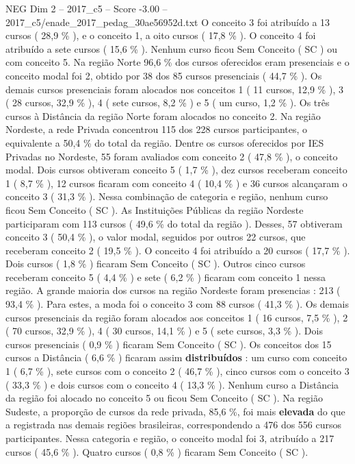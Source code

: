 \begin{textsample}{NEG Dim 2 – 2017\_c5 – Score -3.00 – 2017\_c5/enade\_2017\_pedag\_30ae56952d.txt}
O conceito 3 foi atribuído a 13 cursos ( 28,9 \% ), e o conceito 1, a oito cursos ( 17,8 \% ).
O conceito 4 foi atribuído a sete cursos ( 15,6 \% ).
Nenhum curso ficou Sem Conceito ( SC ) ou com conceito 5.
Na região Norte 96,6 \% dos cursos oferecidos eram presenciais e o conceito modal foi 2, obtido por 38 dos 85 cursos presenciais ( 44,7 \% ).
Os demais cursos presenciais foram alocados nos conceitos 1 ( 11 cursos, 12,9 \% ), 3 ( 28 cursos, 32,9 \% ), 4 ( sete cursos, 8,2 \% ) e 5 ( um curso, 1,2 \% ).
Os três cursos à Distância da região Norte foram alocados no conceito 2.
Na região Nordeste, a rede Privada concentrou 115 dos 228 cursos participantes, o equivalente a 50,4 \% do total da região.
Dentre os cursos oferecidos por IES Privadas no Nordeste, 55 foram avaliados com conceito 2 ( 47,8 \% ), o conceito modal.
Dois cursos obtiveram conceito 5 ( 1,7 \% ), dez cursos receberam conceito 1 ( 8,7 \% ), 12 cursos ficaram com conceito 4 ( 10,4 \% ) e 36 cursos alcançaram o conceito 3 ( 31,3 \% ).
Nessa combinação de categoria e região, nenhum curso ficou Sem Conceito ( SC ).
As Instituições Públicas da região Nordeste participaram com 113 cursos ( 49,6 \% do total da região ).
Desses, 57 obtiveram conceito 3 ( 50,4 \% ), o valor modal, seguidos por outros 22 cursos, que receberam conceito 2 ( 19,5 \% ).
O conceito 4 foi atribuído a 20 cursos ( 17,7 \% ).
Dois cursos ( 1,8 \% ) ficaram Sem Conceito ( SC ).
Outros cinco cursos receberam conceito 5 ( 4,4 \% ) e sete ( 6,2 \% ) ficaram com conceito 1 nessa região.
A grande maioria dos cursos na região Nordeste foram presencias : 213 ( 93,4 \% ).
Para estes, a moda foi o conceito 3 com 88 cursos ( 41,3 \% ).
Os demais cursos presenciais da região foram alocados aos conceitos 1 ( 16 cursos, 7,5 \% ), 2 ( 70 cursos, 32,9 \% ), 4 ( 30 cursos, 14,1 \% ) e 5 ( sete cursos, 3,3 \% ).
Dois cursos presenciais ( 0,9 \% ) ficaram Sem Conceito ( SC ).
Os conceitos dos 15 cursos a Distância ( 6,6 \% ) ficaram assim \textbf{distribuídos} : um curso com conceito 1 ( 6,7 \% ), sete cursos com o conceito 2 ( 46,7 \% ), cinco cursos com o conceito 3 ( 33,3 \% ) e dois cursos com o conceito 4 ( 13,3 \% ).
Nenhum curso a Distância da região foi alocado no conceito 5 ou ficou Sem Conceito ( SC ).
Na região Sudeste, a proporção de cursos da rede privada, 85,6 \%, foi mais \textbf{elevada} do que a registrada nas demais regiões brasileiras, correspondendo a 476 dos 556 cursos participantes.
Nessa categoria e região, o conceito modal foi 3, atribuído a 217 cursos ( 45,6 \% ).
Quatro cursos ( 0,8 \% ) ficaram Sem Conceito ( SC ).

\end{textsample}
